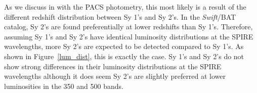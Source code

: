 As we discuss in \citet{Melendez:2014yu} with the PACS photometry, this most likely is a result of the different redshift distribution between Sy 1's and Sy 2's. In the \textit{Swift}/BAT catalog, Sy 2's are found preferentially at lower redshifts than Sy 1's. Therefore, assuming Sy 1's and Sy 2's have identical luminosity distributions at the SPIRE wavelengths, more Sy 2's are expected to be detected compared to Sy 1's. As shown in Figure~\ref{lum_dist}, this is exactly the case. Sy 1's and Sy 2's do not show strong differences in their luminosity distributions at the SPIRE wavelengths although it does seem Sy 2's are slightly preferred at lower luminosities in the 350 \micron{} and 500 \micron{} bands.